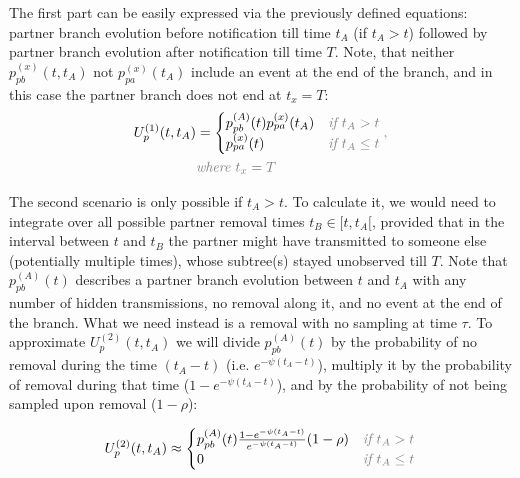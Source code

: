 \documentclass[10pt,letterpaper]{article}
\begin{document}
The first part can be easily expressed via the previously defined equations: partner branch evolution before notification till time $t_A$ (if $t_A > t$) followed by partner branch evolution after notification till time $T$. Note, that neither  $p_{pb}^{(x)}(t, t_A)$ not $p_{pa}^{(x)}(t_A)$ include an event at the end of the branch, and in this case the partner branch does not end at $t_x = T$:
\begin{equation}
\begin{split}
U_p^{(1)}(t, t_A) &= 
\begin{cases}
p_{pb}^{(A)}(t) p_{pa}^{(x)}(t_A) & \textit{\color{gray} if $t_A > t$}\\
p_{pa}^{(x)}(t) & \textit{\color{gray} if $t_A \leq t$}
\end{cases}{\color{gray},}\\
&\textit{\color{gray}where $t_x =T$}\\
\end{split}
\end{equation} 

The second scenario is only possible if $t_A > t$. To calculate it, we would need to integrate over all possible partner removal times $t_B \in [t, t_A[$, provided that in the interval between $t$ and $t_B$ the partner might have transmitted to someone else (potentially multiple times), whose subtree(s) stayed unobserved till $T$. Note that $p_{pb}^{(A)}(t)$ describes a partner branch evolution between $t$ and $t_A$ with any number of hidden transmissions, no removal along it, and no event at the end of the branch. What we need instead is a removal with no sampling at time $\tau$. To approximate $U_p^{(2)}(t, t_A)$ we will divide $p_{pb}^{(A)}(t)$ by the probability of no removal during the time $(t_A - t)$ (i.e. $e^{-\psi(t_A - t)}$), multiply it by the probability of removal during that time ($1 - e^{-\psi(t_A - t)}$), and by the probability of not being sampled upon removal ($1 - \rho$):

\begin{equation}
U_p^{(2)}(t, t_A) \approx 
\begin{cases}
p_{pb}^{(A)}(t) \frac{1 - e^{-\psi(t_A - t)}}{e^{-\psi(t_A - t)}} (1 - \rho)& \textit{\color{gray} if $t_A > t$}\\
0 & \textit{\color{gray} if $t_A \leq t$}
\end{cases}
\end{equation}

\end{document}
